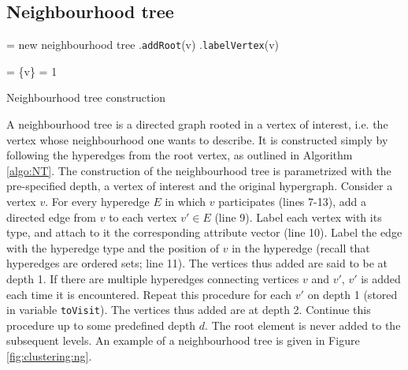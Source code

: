\subsection{Neighbourhood tree}
\label{sec:NT}



\begin{algorithm}[t]
\SetAlgoLined
{}
 \NT = new neighbourhood tree\; 
 \NT.\texttt{addRoot}(v)\;
 \NT.\texttt{labelVertex}(v) 
 
 \Tovisit = \{v\} 
 \D = 1 
 
 \caption{Neighbourhood tree construction}
 \label{algo:NT}
\end{algorithm}


A neighbourhood tree is a directed graph rooted in a vertex of interest, i.e. the vertex whose neighbourhood one wants to describe.
It is constructed simply by following the hyperedges from the root vertex, as outlined in Algorithm \ref{algo:NT}.
The construction of the neighbourhood tree is parametrized with the pre-specified depth, a vertex of interest and the original hypergraph. 
Consider a vertex $v$.    
For every hyperedge $E$ in which $v$ participates (lines 7-13), add a directed edge from $v$ to each vertex $v' \in E$ (line 9).
Label each vertex with its type, and attach to it the corresponding attribute vector (line 10). 
Label the edge with the hyperedge type and the position of $v$ in the hyperedge (recall that hyperedges are ordered sets; line 11). 
The vertices thus added are said to be at depth 1.  
If there are multiple hyperedges connecting vertices $v$ and $v'$, $v'$ is added each time it is encountered.
Repeat this procedure for each $v'$ on depth 1 (stored in variable \texttt{toVisit}).
The vertices thus added are at depth 2.
Continue this procedure up to some predefined depth $d$.   
The root element is never added to the subsequent levels.
An example of a neighbourhood tree is given in Figure \ref{fig:clustering:ng}.


